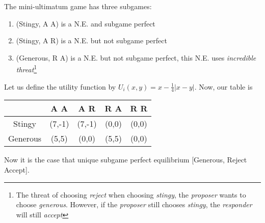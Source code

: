 \begin{example}
      The mini-ultimatum game has three subgames:
      \begin{enumerate}
            \item (Stingy, A A) is a N.E. and subgame perfect
            \item (Stingy, A R) is a N.E. but not subgame perfect
            \item (Generous, R A) is a N.E. but not subgame perfect, this N.E. uses \textit{incredible threat}\footnote{The threat of choosing \textit{reject} when choosing \textit{stingy}, the \textit{proposer} wants to choose \textit{generous}. However, if the \textit{proposer} still chooses \textit{stingy}, the \textit{responder} will still \textit{accept}}
      \end{enumerate}
\end{example}


\begin{example}
      Let us define the utility function by $U_i(x,y) = x - \frac{1}{4} |x-y| $. Now, our table is

      \begin{table}[ht!]
            \begin{center}
                  \begin{tabular}{ c | c c c c}
                                 & A A    & A R    & R A   & R R   \\ \hline
                        Stingy   & (7,-1) & (7,-1) & (0,0) & (0,0) \\
                        Generous & (5,5)  & (0,0)  & (5,5) & (0,0)
                  \end{tabular}
            \end{center}
      \end{table}
      Now it is the case that unique subgame perfect equilibrium [Generous, Reject Accept].
\end{example}


